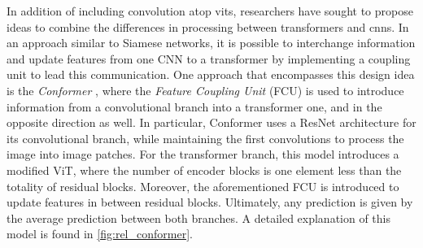 
\noindent In addition of including convolution atop \glspl{vit}, researchers have sought to propose 
ideas to combine the differences in processing between transformers and \glspl{cnn}. In an 
approach similar to Siamese networks, it is possible to interchange information and update 
features from one CNN to a transformer by implementing a coupling unit to lead this 
communication. One approach that encompasses this design idea is the \emph{Conformer} \autocite{
peng2021conformer}, where the \emph{Feature Coupling Unit} (FCU) is used to introduce information 
from a convolutional branch into a transformer one, and in the opposite direction as well. In 
particular, Conformer uses a ResNet architecture for its convolutional branch, while 
maintaining the first convolutions to process the image into image patches. For the transformer 
branch, this model introduces a modified ViT, where the number of encoder blocks is one element 
less than the totality of residual blocks. Moreover, the aforementioned FCU is introduced to update 
features in between residual blocks. Ultimately, any prediction is given by the average prediction 
between both branches. A detailed explanation of this model is found in \autoref{fig:rel_conformer}.